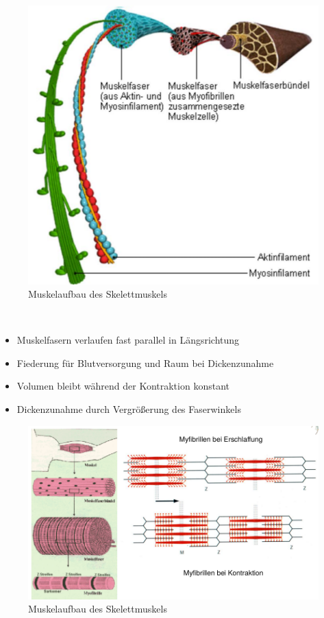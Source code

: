\begin{figure}[h!]
	\centering
		\includegraphics[width=0.5\linewidth]{figures/ch03_musclefibres.png}
		\caption{Muskelaufbau des Skelettmuskels}
	\label{Aufbau}
\end{figure}\\
\begin{itemize}
	\item Muskelfasern verlaufen fast parallel in Längsrichtung
	\item Fiederung für Blutversorgung und Raum bei Dickenzunahme
	\item Volumen bleibt während der Kontraktion konstant 
	\item Dickenzunahme durch Vergrößerung des Faserwinkels
\end{itemize}
\begin{figure}[h!]
	\centering
		\includegraphics[width=0.5\linewidth]{figures/ch03_muskelfkt.png}
		\caption{Muskelaufbau des Skelettmuskels}
	\label{Fkt}
\end{figure}
